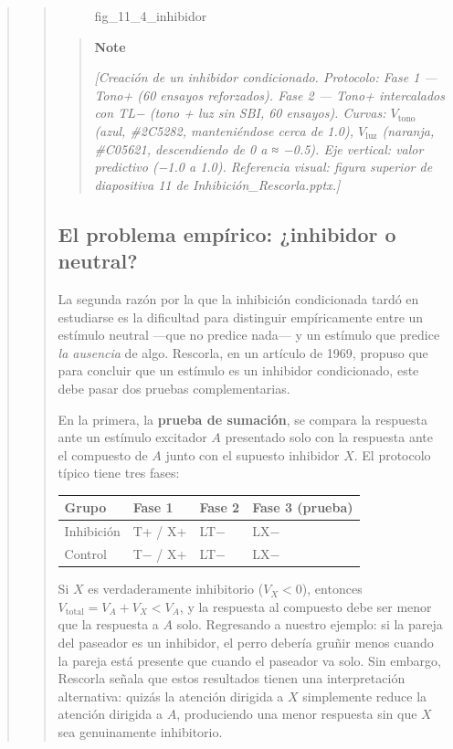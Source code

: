 \documentclass[
  letterpaper,
  DIV=11,
  numbers=noendperiod]{scrreprt}
\newcounter{none} %
\begin{document}
\begin{tcolorbox}[enhanced jigsaw, arc=.35mm, bottomrule=.15mm, breakable, colback=white, colframe=quarto-callout-note-color-frame, left=2mm, leftrule=.75mm, opacityback=0, rightrule=.15mm, toprule=.15mm]
\begin{quote}
\begin{quote}
\begin{figure}[H]
{}

\caption{fig\_11\_4\_inhibidor}

\end{figure}%

\begin{quote}
\textbf{Note}

\emph{{[}Creación de un inhibidor condicionado. Protocolo: Fase 1 ---
Tono+ (60 ensayos reforzados). Fase 2 --- Tono+ intercalados con TL−
(tono + luz sin SBI, 60 ensayos). Curvas: \(V_{\text{tono}}\) (azul,
\#2C5282, manteniéndose cerca de 1.0), \(V_{\text{luz}}\) (naranja,
\#C05621, descendiendo de 0 a ≈ −0.5). Eje vertical: valor predictivo
(−1.0 a 1.0). Referencia visual: figura superior de diapositiva 11 de
Inhibición\_Rescorla.pptx.{]}}
\end{quote}

\mbox{}%
\subsection{El problema empírico: ¿inhibidor o
neutral?}\label{el-problema-empuxedrico-inhibidor-o-neutral}

La segunda razón por la que la inhibición condicionada tardó en
estudiarse es la dificultad para distinguir empíricamente entre un
estímulo neutral ---que no predice nada--- y un estímulo que predice
\emph{la ausencia} de algo. Rescorla, en un artículo de 1969, propuso
que para concluir que un estímulo es un inhibidor condicionado, este
debe pasar dos pruebas complementarias.

En la primera, la \textbf{prueba de sumación}, se compara la respuesta
ante un estímulo excitador \(A\) presentado solo con la respuesta ante
el compuesto de \(A\) junto con el supuesto inhibidor \(X\). El
protocolo típico tiene tres fases:

{\def\LTcaptype{none} %
\begin{longtable}[]{@{}llll@{}}
\toprule\noalign{}
Grupo & Fase 1 & Fase 2 & Fase 3 (prueba) \\
\midrule\noalign{}
\endhead
\bottomrule\noalign{}
\endlastfoot
Inhibición & T+ / X+ & LT− & LX− \\
Control & T− / X+ & LT− & LX− \\
\end{longtable}
}

Si \(X\) es verdaderamente inhibitorio (\(V_X < 0\)), entonces
\(V_{\text{total}} = V_A + V_X < V_A\), y la respuesta al compuesto debe
ser menor que la respuesta a \(A\) solo. Regresando a nuestro ejemplo:
si la pareja del paseador es un inhibidor, el perro debería gruñir menos
cuando la pareja está presente que cuando el paseador va solo. Sin
embargo, Rescorla señala que estos resultados tienen una interpretación
alternativa: quizás la atención dirigida a \(X\) simplemente reduce la
atención dirigida a \(A\), produciendo una menor respuesta sin que \(X\)
sea genuinamente inhibitorio.


\end{quote}
\end{quote}
\end{tcolorbox}
\end{document}
